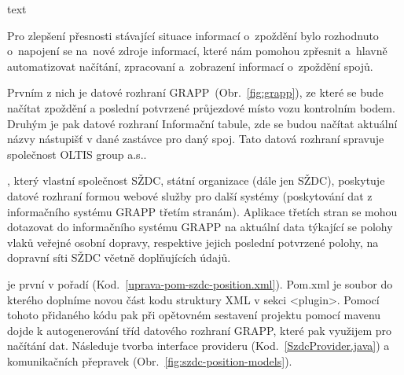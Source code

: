 text


Pro zlepšení přesnosti stávající situace informací o~zpoždění bylo rozhodnuto o~napojení se na~nové zdroje informací, které nám pomohou zpřesnit a~hlavně automatizovat načítání, zpracovaní a~zobrazení informací o~zpoždění spojů.

Prvním z nich je datové rozhraní GRAPP~(Obr.~\ref{fig:grapp}), ze které se bude načítat zpoždění a poslední potvrzené průjezdové místo vozu kontrolním bodem. Druhým je pak datové rozhraní Informační tabule, zde se budou načítat aktuální názvy nástupišť v dané zastávce pro daný spoj. Tato datová rozhraní spravuje společnost OLTIS group a.s..



, který vlastní společnost SŽDC, státní organizace (dále jen SŽDC), poskytuje datové rozhraní formou webové služby pro další systémy (poskytování dat z informačního systému GRAPP třetím stranám). Aplikace třetích stran se mohou dotazovat do informačního systému GRAPP na aktuální data týkající se polohy vlaků veřejné osobní dopravy, respektive jejich poslední potvrzené polohy, na dopravní síti SŽDC včetně doplňujících údajů.

je první v pořadí (Kod.~\ref{uprava-pom-szdc-position.xml}). Pom.xml je soubor do kterého doplníme novou část kodu struktury XML v sekci <plugin>. Pomocí tohoto přidaného kódu pak při opětovném sestavení projektu pomocí mavenu dojde k autogenerování tříd datového rozhraní GRAPP, které pak využijem pro načítání dat.
Následuje tvorba interface provideru (Kod.~\ref{SzdcProvider.java}) a komunikačních přepravek (Obr.~\ref{fig:szdc-position-models}).

